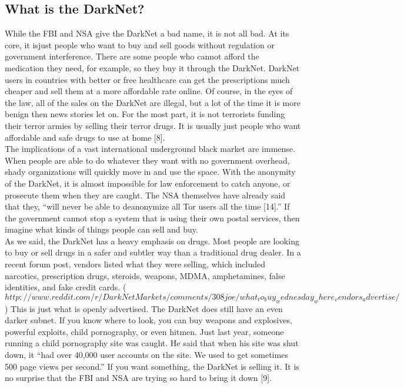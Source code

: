 \documentclass[twocolumn,letterpaper,10pt]{article}
\begin{document}
\subsection{What is the DarkNet?}

While the FBI and NSA give the DarkNet a bad name, it is not all bad. At its core, it isjust people who want to buy and sell goods without regulation or government interference. There are some people who cannot afford the medication they need, for example, so they buy it through the DarkNet. DarkNet users in countries with better or free healthcare can get the prescriptions much cheaper and sell them at a more affordable rate online. Of course, in the eyes of the law, all of the sales on the DarkNet are illegal, but a lot of the time it is more benign then news stories let on. For the most part, it is not terrorists funding their terror armies by selling their terror drugs. It is usually just people who want affordable and safe drugs to use at home [8].\\
\indent The implications of a vast international underground black market are immense. When people are able to do whatever they want with no government overhead, shady organizations will quickly move in and use the space. With the anonymity of the DarkNet, it is almost impossible for law enforcement to catch anyone, or prosecute them when they are caught. The NSA themselves have already said that they, “will never be able to deanonymize all Tor users all the time [14].” If the government cannot stop a system that is using their own postal services, then imagine what kinds of things people can sell and buy.\\
\indent As we said, the DarkNet has a heavy emphasis on drugs. Most people are looking to buy or sell drugs in a safer and subtler way than a traditional drug dealer. In a recent forum post, vendors listed what they were selling, which included narcotics, prescription drugs, steroids, weapons, MDMA, amphetamines, false identities, and fake credit cards. ($http://www.reddit.com/r/DarkNetMarkets/comments/308joe/what_to_buy_wednesday_where_vendors_advertise/$) This is just what is openly advertised. The DarkNet does still have an even darker subnet. If you know where to look, you can buy weapons and explosives, powerful exploits, child pornography, or even hitmen. Just last year, someone running a child pornography site was caught. He said that when his site was shut down, it “had over 40,000 user accounts on the site. We used to get sometimes 500 page views per second.” If you want something, the DarkNet is selling it. It is no surprise that the FBI and NSA are trying so hard to bring it down [9].
\end{document}

